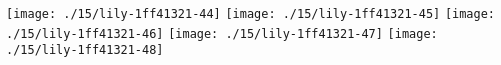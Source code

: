 \fi
\texttt{[image: ./15/lily-1ff41321-44]}%
\ifx\betweenLilyPondSystem \undefined
  \linebreak
\else
  \expandafter{}%
\fi
\texttt{[image: ./15/lily-1ff41321-45]}%
\ifx\betweenLilyPondSystem \undefined
  \linebreak
\else
  \expandafter{}%
\fi
\texttt{[image: ./15/lily-1ff41321-46]}%
\ifx\betweenLilyPondSystem \undefined
  \linebreak
\else
  \expandafter{}%
\fi
\texttt{[image: ./15/lily-1ff41321-47]}%
\ifx\betweenLilyPondSystem \undefined
  \linebreak
\else
  \expandafter{}%
\fi
\texttt{[image: ./15/lily-1ff41321-48]}%

